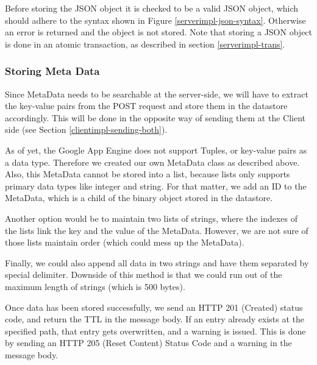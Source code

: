 Before storing the JSON object it is checked to be a valid JSON object, which
should adhere to the syntax shown in Figure \ref{serverimpl-json-syntax}.
Otherwise an error is returned and the object is not stored. Note that storing a
JSON object is done in an atomic transaction, as described in section
\ref{serverimpl-trans}.

\begin{figure*}[ht] %
\begin{center}
\begin{code}
\end{code}
\caption{Advert syntax of a JSON object.\label{serverimpl-json-syntax}}
\end{center}
\end{figure*}

\subsubsection{Storing Meta Data}
Since MetaData needs to be searchable at the server-side, we will have to extract
the key-value pairs from the POST request and store them in the datastore
accordingly. This will be done in the opposite way of sending them at the Client
side (see Section \ref{clientimpl-sending-both}).

As of yet, the Google App Engine does not support Tuples, or key-value pairs as a
data type. Therefore we created our own MetaData class as described above. Also,
this MetaData cannot be stored into a list, because lists only supports primary
data types like integer and string. For that matter, we add an ID to the
MetaData, which is a child of the binary object stored in the datastore.

Another option would be to maintain two lists of strings, where the indexes of
the lists link the key and the value of the MetaData. However, we are not sure of
those lists maintain order (which could mess up the MetaData).

Finally, we could also append all data in two strings and have them separated by
special delimiter. Downside of this method is that we could run out of the
maximum length of strings (which is 500 bytes).

Once data has been stored successfully, we send an HTTP 201 (Created) status
code, and return the TTL in the message body. If an entry already exists at the
specified path, that entry gets overwritten, and a warning is issued. This is
done by sending an HTTP 205 (Reset Content) Status Code and a warning in the
message body.

